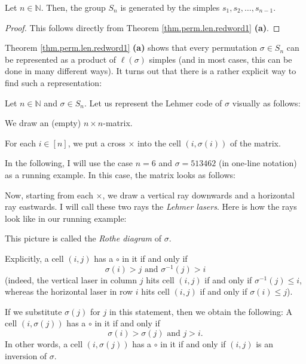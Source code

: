 \begin{corollary}
\label{cor.perm.generated}Let $n\in\mathbb{N}$. Then, the group $S_{n}$ is
generated by the simples $s_{1},s_{2},\ldots,s_{n-1}$.
\end{corollary}

\begin{proof}
This follows directly from Theorem \ref{thm.perm.len.redword1} \textbf{(a)}.
\end{proof}

Theorem \ref{thm.perm.len.redword1} \textbf{(a)} shows that every permutation
$\sigma\in S_{n}$ can be represented as a product of $\ell\left(
\sigma\right)  $ simples (and in most cases, this can be done in many
different ways). It turns out that there is a rather explicit way to find such
a representation:

\begin{remark}
\label{rmk.perm.redword-lehmer}Let $n\in\mathbb{N}$ and $\sigma\in S_{n}$. Let
us represent the Lehmer code of $\sigma$ visually as follows:

We draw an (empty) $n\times n$-matrix.

For each $i\in\left[  n\right]  $, we put a cross $\times$ into the cell
$\left(  i,\sigma\left(  i\right)  \right)  $ of the matrix.

In the following, I will use the case $n=6$ and $\sigma=513462$ (in one-line
notation) as a running example. In this case, the matrix looks as follows:%
\[%
\]


Now, starting from each $\times$, we draw a vertical ray downwards and a
horizontal ray eastwards. I will call these two rays the \emph{Lehmer lasers}.
Here is how the rays look like in our running example:%
\[%
\]


This picture is called the \emph{Rothe diagram} of $\sigma$.

Explicitly, a cell $\left(  i,j\right)  $ has a $\circ$ in it if and only if%
\[
\sigma\left(  i\right)  >j\text{ and }\sigma^{-1}\left(  j\right)  >i
\]
(indeed, the vertical laser in column $j$ hits cell $\left(  i,j\right)  $ if
and only if $\sigma^{-1}\left(  j\right)  \leq i$, whereas the horizontal
laser in row $i$ hits cell $\left(  i,j\right)  $ if and only if
$\sigma\left(  i\right)  \leq j$).

If we substitute $\sigma\left(  j\right)  $ for $j$ in this statement, then we
obtain the following: A cell $\left(  i,\sigma\left(  j\right)  \right)  $ has
a $\circ$ in it if and only if%
\[
\sigma\left(  i\right)  >\sigma\left(  j\right)  \text{ and }j>i.
\]
In other words, a cell $\left(  i,\sigma\left(  j\right)  \right)  $ has a
$\circ$ in it if and only if $\left(  i,j\right)  $ is an inversion of
$\sigma$.


\end{remark}
